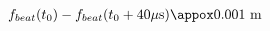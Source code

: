 \documentclass[preview]{standalone}
\begin{document}
\begin{align*}
f_{beat}(t_0) - f_{beat}(t_0 + 40\mu\text{s}) \appox \text{0.001 m}
\end{align*}
\end{document}
